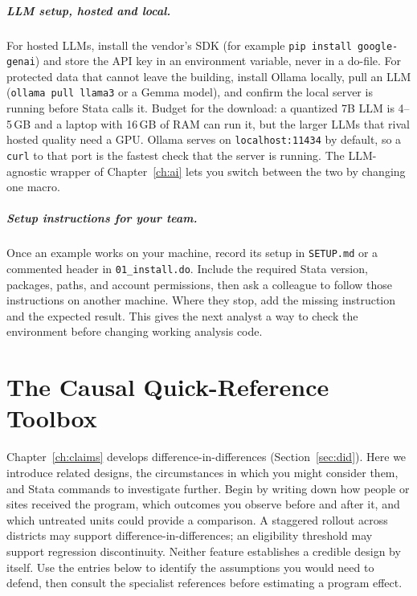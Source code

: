 \paragraph{LLM setup, hosted and local.} For hosted LLMs, install the vendor's SDK (for example \texttt{pip install google-genai}) and store the API key in an environment variable, never in a do-file. For protected data that cannot leave the building, install Ollama locally, pull an LLM (\texttt{ollama pull llama3} or a Gemma model), and confirm the local server is running before Stata calls it. Budget for the download: a quantized 7B LLM is 4--5\,GB and a laptop with 16\,GB of RAM can run it, but the larger LLMs that rival hosted quality need a GPU. Ollama serves on \texttt{localhost:11434} by default, so a \texttt{curl} to that port is the fastest check that the server is running. The LLM-agnostic wrapper of Chapter~\ref{ch:ai} lets you switch between the two by changing one macro.

\paragraph{Setup instructions for your team.} Once an example works on your machine, record its setup in \texttt{SETUP.md} or a commented header in \texttt{01\_install.do}. Include the required Stata version, packages, paths, and account permissions, then ask a colleague to follow those instructions on another machine. Where they stop, add the missing instruction and the expected result. This gives the next analyst a way to check the environment before changing working analysis code.

\chapter{The Causal Quick-Reference Toolbox}\label{app:causal}
Chapter~\ref{ch:claims} develops difference-in-differences (Section~\ref{sec:did}). Here we introduce related designs, the circumstances in which you might consider them, and Stata commands to investigate further. Begin by writing down how people or sites received the program, which outcomes you observe before and after it, and which untreated units could provide a comparison. A staggered rollout across districts may support difference-in-differences; an eligibility threshold may support regression discontinuity. Neither feature establishes a credible design by itself. Use the entries below to identify the assumptions you would need to defend, then consult the specialist references before estimating a program effect.

